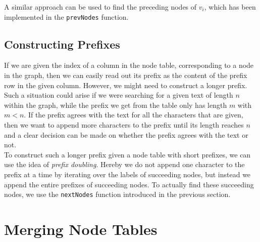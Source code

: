 \documentclass[a4paper,12pt,twoside,BCOR=10mm]{scrbook}
\begin{document}
A similar approach can be used to find the preceding nodes of $ v_i $,
which has been implemented in the \texttt{prevNodes} function.


\subsection{Constructing Prefixes}

If we are given the index of a column in the node table, corresponding to a node in the graph,
then we can easily read out its prefix as the content of the prefix row in the given column.
However, we might need to construct a longer prefix.
Such a situation could arise if we were searching for a given text of length $ n $ within the
graph, while the prefix we get from the table only has length $ m $ with $ m < n $.
If the prefix agrees with the text for all the characters that are given, then we want to
append more characters to the prefix until its length reaches $ n $ and a clear decision can
be made on whether the prefix agrees with the text or not. \\
To construct such a longer prefix given a node table with short prefixes, we can use the
idea of \textit{prefix doubling}.
Hereby we do not append one character to the prefix at a time by iterating over the labels of succeeding nodes,
but instead we append the entire prefixes of succeeding nodes.
To actually find these succeeding nodes, we use the \texttt{nextNodes} function introduced in the previous section.


%

\section{Merging Node Tables}
\label{sec:gml_merging_node_tables}
%
\end{document}
